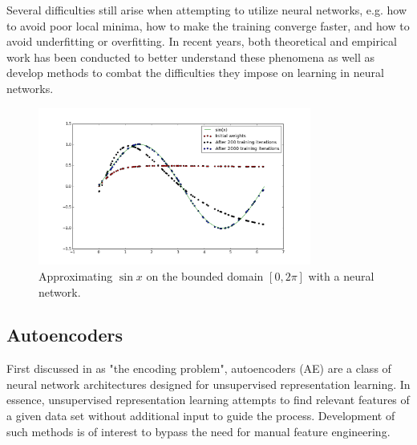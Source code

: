 Several difficulties still arise when attempting to utilize neural networks, e.g. how to avoid poor local minima, how to make the training converge faster, and how to avoid underfitting or overfitting. In recent years, both theoretical and empirical work has been conducted to better understand these phenomena as well as develop methods to combat the difficulties they impose on learning in neural networks. 

\begin{figure}[!htb]
  \centering
  \includegraphics[width=0.8\textwidth]{images/function_approximation.png}
  \caption{Approximating $\sin x$ on the bounded domain $[0, 2\pi]$ with a neural network.}
  \label{fig:function_approximation}
\end{figure}

\subsection{Autoencoders}
\label{subsection:autoencoders}

First discussed in \cite{encoding_problem} as "the encoding problem", autoencoders (AE) are a class of neural network architectures designed for unsupervised representation learning. In essence, unsupervised representation learning attempts to find relevant features of a given data set without additional input to guide the process. Development of such methods is of interest to bypass the need for manual feature engineering.

